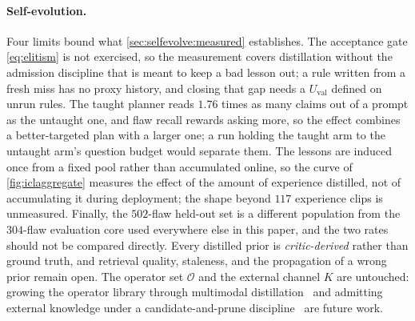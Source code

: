 \paragraph{Self-evolution.} Four limits bound what
\cref{sec:selfevolve:measured} establishes. The acceptance gate
\eqref{eq:elitism} is not exercised, so the measurement covers distillation
without the admission discipline that is meant to keep a bad lesson out; a rule
written from a fresh miss has no proxy history, and closing that gap needs a
$U_{\mathrm{val}}$ defined on unrun rules. The taught planner reads $1.76$ times
as many claims out of a prompt as the untaught one, and flaw recall rewards
asking more, so the effect combines a better-targeted plan with a larger one; a
run holding the taught arm to the untaught arm's question budget would separate
them. The lessons are induced once from a fixed pool rather than accumulated online, so the curve of
\cref{fig:iclaggregate} measures the effect of the amount of experience distilled, not of
accumulating it during deployment; the shape beyond $117$
experience clips is unmeasured. Finally, the
$502$-flaw held-out set is a different population from the $304$-flaw evaluation
core used everywhere else in this paper, and the two rates should not be compared
directly. Every distilled prior is \emph{critic-derived} rather than ground truth,
and retrieval quality, staleness, and the propagation of a wrong prior remain
open. The operator set $\mathcal{O}$ and the external channel $K$ are untouched: growing
the operator library through multimodal
distillation~\cite{plugmem2026,vilomem2026,m3agent2025} and admitting external
knowledge under a candidate-and-prune
discipline~\cite{contexttraining2026} are future work.
